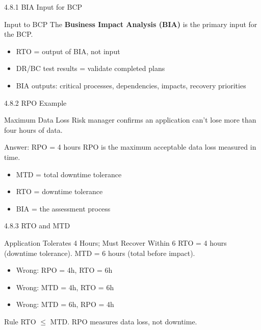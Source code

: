 \documentclass{beamer}
\begin{document}
	\begin{frame}{4.8.1 BIA Input for BCP}
		\begin{block}{Input to BCP}
			The \textbf{Business Impact Analysis (BIA)} is the primary input for the BCP.
		\end{block}
		\begin{itemize}
			\item RTO = output of BIA, not input
			\item DR/BC test results = validate completed plans
			\item BIA outputs: critical processes, dependencies, impacts, recovery priorities
		\end{itemize}
	\end{frame}
	
	\begin{frame}{4.8.2 RPO Example}
		\begin{block}{Maximum Data Loss}
			Risk manager confirms an application can't lose more than four hours of data.
		\end{block}
		\begin{exampleblock}{Answer: RPO = 4 hours}
			RPO is the maximum acceptable data loss measured in time.
		\end{exampleblock}
		\begin{itemize}
			\item MTD = total downtime tolerance
			\item RTO = downtime tolerance
			\item BIA = the assessment process
		\end{itemize}
	\end{frame}
	
	\begin{frame}{4.8.3 RTO and MTD}
		\begin{block}{Application Tolerates 4 Hours; Must Recover Within 6}
			RTO = 4 hours (downtime tolerance). MTD = 6 hours (total before impact).
		\end{block}
		\begin{itemize}
			\item Wrong: RPO = 4h, RTO = 6h
			\item Wrong: MTD = 4h, RTO = 6h
			\item Wrong: MTD = 6h, RPO = 4h
		\end{itemize}
		\begin{alertblock}{Rule}
			RTO $\le$ MTD. RPO measures data loss, not downtime.
		\end{alertblock}
	\end{frame}
	
\end{document}
